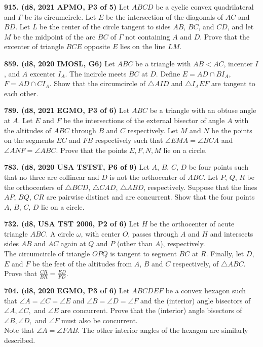 \documentclass{article}
\begin{document}
\textbf{915. (\color{red}d8\color{black}, 2021 APMO, P3 of 5)} Let $ABCD$ be a cyclic convex quadrilateral and $\Gamma$ be its circumcircle. Let $E$ be the intersection of the diagonals of $AC$ and $BD$. Let $L$ be the center of the circle tangent to sides $AB$, $BC$, and $CD$, and let $M$ be the midpoint of the arc $BC$ of $\Gamma$ not containing $A$ and $D$. Prove that the excenter of triangle $BCE$ opposite $E$ lies on the line $LM$.

\textbf{859. (\color{red}d8\color{black}, 2020 IMOSL, G6)} Let $ABC$ be a triangle with $AB < AC$, incenter $I$, and $A$ excenter $I_{A}$. The incircle meets $BC$ at $D$. Define $E = AD\cap BI_{A}$, $F = AD\cap CI_{A}$. Show that the circumcircle of $\triangle AID$ and $\triangle I_{A}EF$ are tangent to each other.

\textbf{789. (\color{red}d8\color{black}, 2021 EGMO, P3 of 6)} Let $ABC$ be a triangle with an obtuse angle at $A$. Let $E$ and $F$ be the intersections of the external bisector of angle $A$ with the altitudes of $ABC$ through $B$ and $C$ respectively. Let $M$ and $N$ be the points on the segments $EC$ and $FB$ respectively such that $\angle EMA = \angle BCA$ and $\angle ANF = \angle ABC$. Prove that the points $E, F, N, M$ lie on a circle.

\textbf{783. (\color{red}d8\color{black}, 2020 USA TSTST, P6 of 9)} Let $A$, $B$, $C$, $D$ be four points such that no three are collinear and $D$ is not the orthocenter of $ABC$. Let $P$, $Q$, $R$ be the orthocenters of $\triangle BCD$, $\triangle CAD$, $\triangle ABD$, respectively. Suppose that the lines $AP$, $BQ$, $CR$ are pairwise distinct and are concurrent. Show that the four points $A$, $B$, $C$, $D$ lie on a circle.

\textbf{732. (\color{red}d8\color{black}, USA TST 2006, P2 of 6)} Let $H$ be the orthocenter of acute triangle $ABC$. A circle $\omega$, with center $O$, passes through $A$ and $H$ and intersects sides $AB$ and $AC$ again at $Q$ and $P$ (other than $A$), respectively.  \\
The circumcircle of triangle $OPQ$ is tangent to segment $BC$ at $R$. Finally, let $D$, $E$ and $F$ be the feet of the altitudes from $A$, $B$ and $C$ respectively, of $\triangle ABC$. \\

Prove that $\frac{CR}{BR}=\frac{ED}{FD}.$

\textbf{704. (\color{red}d8\color{black}, 2020 EGMO, P3 of 6)} Let $A B C D E F$ be a convex hexagon such that  $\angle A=\angle C=\angle E$ and $\angle B=\angle D=\angle F$
and the (interior) angle bisectors of $\angle A, \angle C,$ and $\angle E$ are concurrent.
Prove that the (interior) angle bisectors of $\angle B, \angle D,$ and $\angle F$ must also be concurrent.\\
Note that $\angle A=\angle F A B .$ The other interior angles of the hexagon are similarly described.
\end{document}
